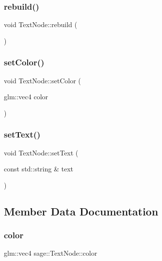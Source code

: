 \subsubsection{\texorpdfstring{rebuild()}{rebuild()}}
{\footnotesize\ttfamily void Text\+Node\+::rebuild (\begin{DoxyParamCaption}{ }\end{DoxyParamCaption})\hspace{0.3cm}{\ttfamily [protected]}}

\mbox{\label{classsage_1_1TextNode_ab08e5884c5a182320d80e53e700e4a5d}} 
\subsubsection{\texorpdfstring{setColor()}{setColor()}}
{\footnotesize\ttfamily void Text\+Node\+::set\+Color (\begin{DoxyParamCaption}\item[{glm\+::vec4}]{color }\end{DoxyParamCaption})}

\mbox{\label{classsage_1_1TextNode_a81f9aa6c3c25d5b2b53904becad654fe}} 
\subsubsection{\texorpdfstring{setText()}{setText()}}
{\footnotesize\ttfamily void Text\+Node\+::set\+Text (\begin{DoxyParamCaption}\item[{const std\+::string \&}]{text }\end{DoxyParamCaption})}



\subsection{Member Data Documentation}
\mbox{\label{classsage_1_1TextNode_a005f3c7841dc825fb762cb84dc667088}} 
\subsubsection{\texorpdfstring{color}{color}}
{\footnotesize\ttfamily glm\+::vec4 sage\+::\+Text\+Node\+::color\hspace{0.3cm}{\ttfamily [private]}}

